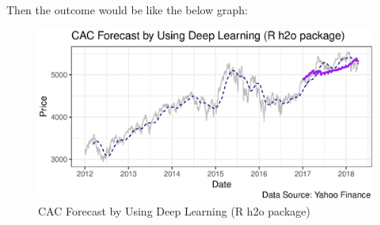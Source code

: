 Then the outcome would be like the below graph:

\FloatBarrier
\begin{figure}[!htbp]
  \centering
  \includegraphics[width=\textwidth]{img/Fig23.eps}
  \caption{CAC Forecast by Using Deep Learning (R h2o package)}
\end{figure}
\FloatBarrier
